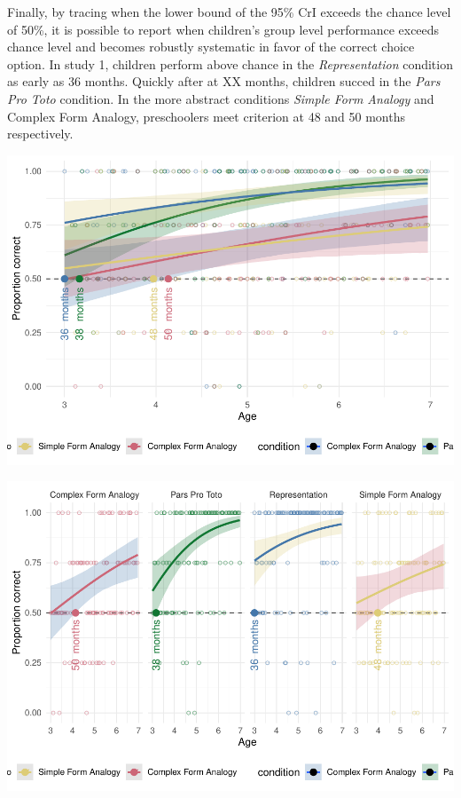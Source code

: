\documentclass[
  man]{apa6}
\begin{document}
Finally, by tracing when the lower bound of the 95\% CrI exceeds the chance level of 50\%, it is possible to report when children's group level performance exceeds chance level and becomes robustly systematic in favor of the correct choice option. In study 1, children perform above chance in the \emph{Representation} condition as early as 36 months. Quickly after at XX months, children succed in the \emph{Pars Pro Toto} condition. In the more abstract conditions \emph{Simple Form Analogy} and Complex Form Analogy, preschoolers meet criterion at 48 and 50 months respectively.

\includegraphics{symlit_rep_manuscript_files/figure-latex/S1_bayes_plot_no_facets-1.pdf}

\includegraphics{symlit_rep_manuscript_files/figure-latex/S1_bayes_plot-1.pdf}
\end{document}
